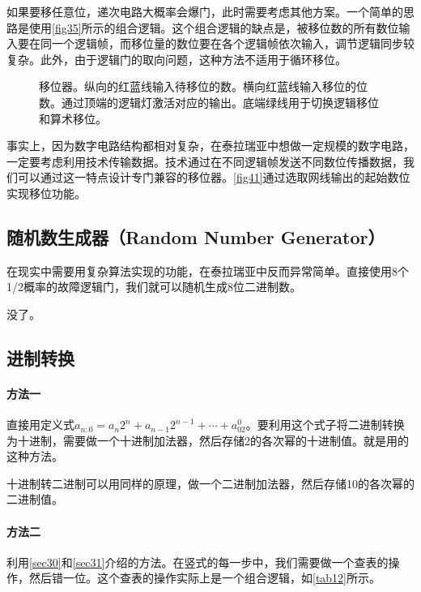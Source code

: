 如果要移任意位，递次电路大概率会爆门，此时需要考虑其他方案。一个简单的思路是使用\autoref{fig35}所示的组合逻辑。这个组合逻辑的缺点是，被移位数的所有数位输入要在同一个逻辑帧，而移位量的数位要在各个逻辑帧依次输入，调节逻辑同步较复杂。此外，由于逻辑门的取向问题，这种方法不适用于循环移位。

\begin{figure}[!ht]
\centering
{}%
%
\caption{移位器。纵向的红蓝线输入待移位的数。横向红蓝线输入移位的位数。通过顶端的逻辑灯激活对应的输出。底端绿线用于切换逻辑移位和算术移位。}\label{fig41}
\end{figure}

事实上，因为数字电路结构都相对复杂，在泰拉瑞亚中想做一定规模的数字电路，一定要考虑利用技术传输数据。技术通过在不同逻辑帧发送不同数位传播数据，我们可以通过这一特点设计专门兼容的移位器。\autoref{fig41}通过选取网线输出的起始数位实现移位功能。

\subsection{随机数生成器（Random Number Generator）}
在现实中需要用复杂算法实现的功能，在泰拉瑞亚中反而异常简单。直接使用8个1/2概率的故障逻辑门，我们就可以随机生成8位二进制数。
\vspace{5cm}

没了。

\subsection{进制转换}

\paragraph*{方法一} 直接用定义式$a_{n:0}=a_n2^n+a_{n-1}2^{n-1}+\cdots+a_02^0$。要利用这个式子将二进制转换为十进制，需要做一个十进制加法器，然后存储2的各次幂的十进制值。就是用的这种方法。

十进制转二进制可以用同样的原理，做一个二进制加法器，然后存储10的各次幂的二进制值。

\paragraph*{方法二} 利用\autoref{sec30}和\autoref{sec31}介绍的方法。在竖式的每一步中，我们需要做一个查表的操作，然后错一位。这个查表的操作实际上是一个组合逻辑，如\autoref{tab12}所示。

